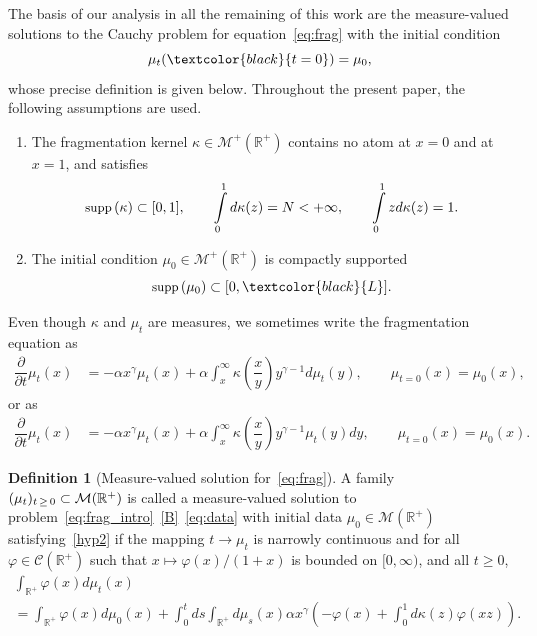 \documentclass[10pt]{amsart}
\theoremstyle{definition}\newtheorem{defi}[theo]{Definition}\newtheorem{rema}[theo]{Remark}\newtheorem{exam}[theo]{Example}\newtheorem{exem}[theo]{Example}\newtheorem{nota}[theo]{Notation}
\newcommand*\dst{\displaystyle}
\newcommand*\p{\partial}
\renewcommand*\a{\alpha}
\newcommand*\R{\mathbb{R}}
\newcommand*\M{\mathcal{M}}
\newcommand{\clC}{\mathcal{C}}
\newcommand{\MT}[1]{\textcolor{black}{#1}}
\newcommand*\supp{{\mbox{\small\rm supp}}\,}
\newcommand*{\Hypenumi}{\renewcommand*{\theenumi}{\textbf{Hyp-\arabic{enumi}}}}
\begin{document}
The basis of our analysis in all the remaining of this work are the measure-valued solutions to the Cauchy problem for equation~\ref{eq:frag} with the initial condition
\begin{equation}\label{eq:data}
\mu _t(\MT{t=0})=\mu _0,
\end{equation}
whose precise definition is given below. Throughout the present paper, the following assumptions are used.
\begin{enumerate}\Hypenumi
\item \label{hyp1}
The fragmentation kernel $\kappa \in \M^+(\R^+)$ contains no atom at $x=0$ and at $x=1$, and satisfies
\begin{equation}
\supp(\kappa)\subset [0,1], \qquad \int\limits_0^1d\kappa(z) =N<+\infty, \qquad \int\limits_0^1 z d\kappa(z)=1.
\end{equation}
\item \label{hyp2}
The initial condition $\mu_0 \in \M^+(\R^+)$ is compactly supported
\begin{equation}
\supp(\mu_0)\subset [0,\MT{L}].
\end{equation}
\end{enumerate}


Even though $\kappa$ and $\mu_t$ are measures, we sometimes write the fragmentation equation as
\begin{equation}\label{eq:frag}
\begin{aligned}
\dfrac{\p}{\p t}\mu_t (x)& =- \a x^{\gamma}\mu_t(x) + \alpha \dst\int_{x}^{\infty}\kappa\left(\dfrac{x}{y} \right)y^{\gamma-1} d\mu_t(y),\qquad
\mu_{t=0}(x) = \mu_0(x),
\end{aligned}
\end{equation}
or as
\begin{equation*}\label{eq:frag2}
\begin{aligned}
\dfrac{\p}{\p t}\mu_t (x)& =- \a x^{\gamma}\mu_t(x) + \alpha \dst\int_{x}^{\infty}\kappa\left(\dfrac{x}{y} \right)y^{\gamma-1} \mu_t(y)dy,\qquad
\mu_{t=0}(x) = \mu_0(x).
\end{aligned}
\end{equation*}

\begin{defi}[Measure-valued solution for~\eqref{eq:frag}]\label{def:measure_valued_sol}
A family $(\mu_t)_{t\,\geq\,0} \subset \M\linebreak(\R^+)$ is called a measure-valued solution to problem~\eqref{eq:frag_intro}~\eqref{B}~\eqref{eq:data} with initial data $\mu_0 \in \M(\R^+)$ satisfying~\eqref{hyp2} if the mapping $t\to \mu_t$ is narrowly continuous and for all $\varphi \in \clC(\R^+)$ such that $x\mapsto \varphi(x)/(1+x)$ is bounded on $[0,\infty)$, and all $t \geq 0$,
\begin{multline}\label{ppcm1}
\int_{\R^+} \varphi(x) d\mu_t(x)\\
= \int_{\R^+} \varphi(x) d\mu_0(x) + \dst\int_0^t ds \dst\int_{\R^+} d\mu_s(x) \alpha x^{\gamma}\left(- \varphi(x) + \dst\int_{0}^{1} d\kappa(z)\varphi(xz)\right).
\end{multline}
\end{defi}
\end{document}
